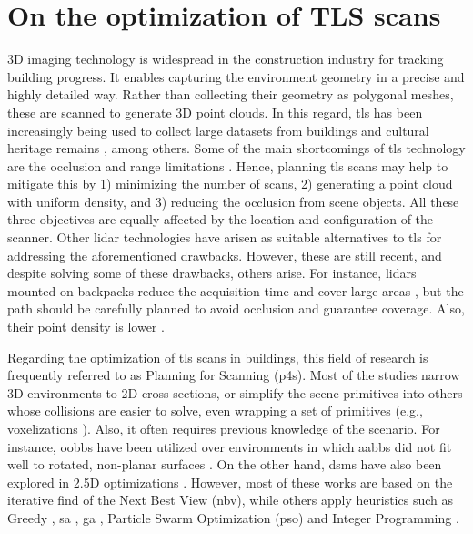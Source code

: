 \section{On the optimization of TLS scans}

3D imaging technology is widespread in the construction industry for tracking building progress. It enables capturing the environment geometry in a precise and highly detailed way. Rather than collecting their geometry as polygonal meshes, these are scanned to generate 3D point clouds. In this regard, \acrshort{tls} has been increasingly being used to collect large datasets from buildings \cite{shariq_revolutionising_2020} and cultural heritage remains \cite{banfi_integration_2019, ham_phased_2020, andriasyan_point_2020}, among others. Some of the main shortcomings of \acrshort{tls} technology are the occlusion and range limitations \cite{soudarissanane_optimizing_2012}. Hence, planning \acrshort{tls} scans may help to mitigate this by 1) minimizing the number of scans, 2) generating a point cloud with uniform density, and 3) reducing the occlusion from scene objects. All these three objectives are equally affected by the location and configuration of the scanner. Other \acrshort{lidar} technologies have arisen as suitable alternatives to \acrshort{tls} for addressing the aforementioned drawbacks. However, these are still recent, and despite solving some of these drawbacks, others arise. For instance, \acrshort{lidar}s mounted on backpacks reduce the acquisition time and cover large areas \cite{rodriguez-gonzalvez_mobile_2017}, but the path should be carefully planned to avoid occlusion and guarantee coverage. Also, their point density is lower \cite{bienert_comparison_2018}.

Regarding the optimization of \acrshort{tls} scans in buildings, this field of research is frequently referred to as Planning for Scanning (\acrshort{p4s}). Most of the studies narrow 3D environments to 2D cross-sections, or simplify the scene primitives into others whose collisions are easier to solve, even wrapping a set of primitives (e.g., voxelizations \cite{wakisaka_optimal_2019}). Also, it often requires previous knowledge of the scenario. For instance, \acrshort{oobb}s have been utilized over environments in which \acrshort{aabb}s did not fit well to rotated, non-planar surfaces \cite{li_3d_2022}. On the other hand, \acrshort{dsm}s have also been explored in 2.5D optimizations \cite{starek_viewshed_2020}. However, most of these works are based on the iterative find of the Next Best View (\acrshort{nbv}), while others apply heuristics such as Greedy \cite{ giorgini_sensor-based_2019}, \acrshort{sa} \cite{chen_indoor_2018}, \acrshort{ga} \cite{jia_comparison_2017}, Particle Swarm Optimization (\acrshort{pso}) \cite{jia_comparison_2017} and Integer Programming \cite{wakisaka_optimal_2019}.

